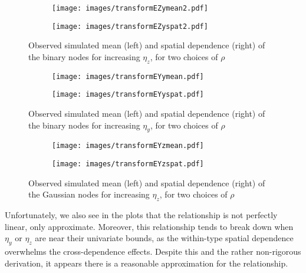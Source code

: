 \documentclass[12pt, a4paper, twoside]{article}
\begin{document}
\begin{figure}[H]
	\centering
	\begin{subfigure}{0.49\textwidth}
		\texttt{[image: images/transformEZymean2.pdf]}%
	\end{subfigure}
	\begin{subfigure}{0.49\textwidth}
		\texttt{[image: images/transformEZyspat2.pdf]}%
	\end{subfigure}
	\caption[Binary mean and spatial dependence for increasing $\eta_z$]{Observed simulated mean (left) and spatial dependence (right) of the binary nodes for increasing $\eta_z$, for two choices of $\rho$}
	\label{testzsbound}
\end{figure}
\begin{figure}[H]
	\centering
	\begin{subfigure}{0.49\textwidth}
		\texttt{[image: images/transformEYymean.pdf]}%
	\end{subfigure}
	\begin{subfigure}{0.49\textwidth}
		\texttt{[image: images/transformEYyspat.pdf]}%
	\end{subfigure}
	\caption[Binary mean and spatial dependence for increasing $\eta_y$]{Observed simulated mean (left) and spatial dependence (right) of the binary nodes for increasing $\eta_y$, for two choices of $\rho$}
	\label{testysboundy}
\end{figure}
	\begin{figure}[H]
	\centering
	\begin{subfigure}{0.49\textwidth}
		\texttt{[image: images/transformEYzmean.pdf]}%
	\end{subfigure}
	\begin{subfigure}{0.49\textwidth}
		\texttt{[image: images/transformEYzspat.pdf]}%
	\end{subfigure}
	\caption[Gaussian mean and spatial dependence for increasing $\eta_y$]{Observed simulated mean (left) and spatial dependence (right) of the Gaussian  nodes for increasing $\eta_z$, for two choices of $\rho$}
	\label{testysboundz}
\end{figure}

Unfortunately, we also see in the plots that the relationship is not perfectly linear, only approximate. Moreover, this relationship tends to break down when $\eta_y$ or $\eta_z$ are near their univariate bounds, as the within-type spatial dependence overwhelms the cross-dependence effects. Despite this and the rather non-rigorous derivation, it appears there is a reasonable approximation for the relationship.
\end{document}
